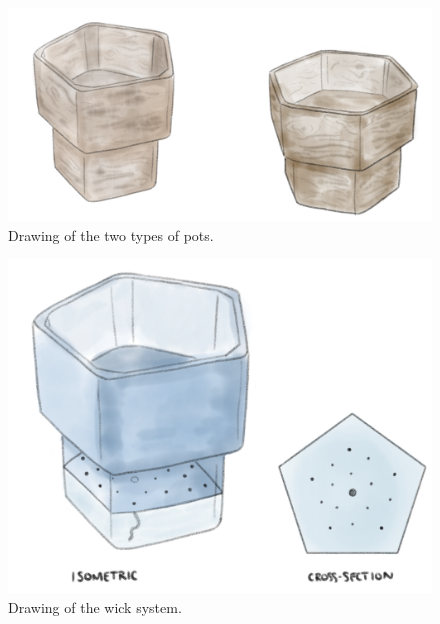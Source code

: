 \documentclass[12pt]{extarticle} %
\begin{document}
\begin{figure}[ht]
    \centering
    \includegraphics[scale=0.2]{images/Drawings/pot drawings.png}
    \caption{Drawing of the two types of pots.}
    \label{fig:pot_drawings}
\end{figure}
\begin{figure}[ht]
    \centering
    \includegraphics[scale=0.2]{images/Drawings/wick system.png}
    \caption{Drawing of the wick system.}
    \label{fig:wick_system}
\end{figure}
\end{document}

